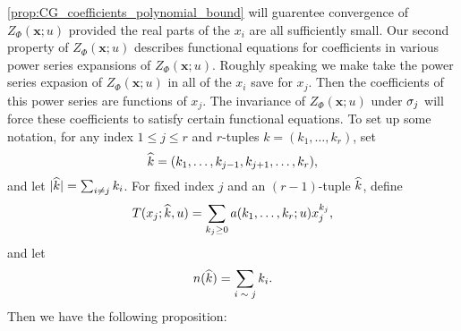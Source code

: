 \documentclass[12pt,reqno,oneside]{amsart}
\begin{document}
    \cref{prop:CG_coefficients_polynomial_bound} will guarentee convergence of $Z_{\Phi}(\mathbf{x};u)$ provided the real parts of the $x_{i}$ are all sufficiently small. Our second property of $Z_{\Phi}(\mathbf{x};u)$ describes functional equations for coefficients in various power series expansions of $Z_{\Phi}(\mathbf{x};u)$. Roughly speaking we make take the power series expasion of $Z_{\Phi}(\mathbf{x};u)$ in all of the $x_{i}$ save for $x_{j}$. Then the coefficients of this power series are functions of $x_{j}$. The invariance of $Z_{\Phi}(\mathbf{x};u)$ under $\sigma_{j}$ will force these coefficients to satisfy certain functional equations. To set up some notation, for any index $1 \le j \le r$ and $r$-tuples $k = (k_{1},\ldots,k_{r})$, set
    \[
        \widehat{k} = (k_{1},\ldots,k_{j-1},k_{j+1},\ldots,k_{r}),
    \]
    and let $|\widehat{k}| = \sum_{i \neq j}k_{i}$. For fixed index $j$ and an $(r-1)$-tuple $\widehat{k}$, define
    \[
        T(x_{j};\widehat{k},u) = \sum_{k_{j} \ge 0}a(k_{1},\ldots,k_{r};u)x_{j}^{k_{j}},
    \]
    and let
    \[
        n(\widehat{k}) = \sum_{\text{$i \sim j$}}k_{i}.
    \]
    Then we have the following proposition:
\end{document}
